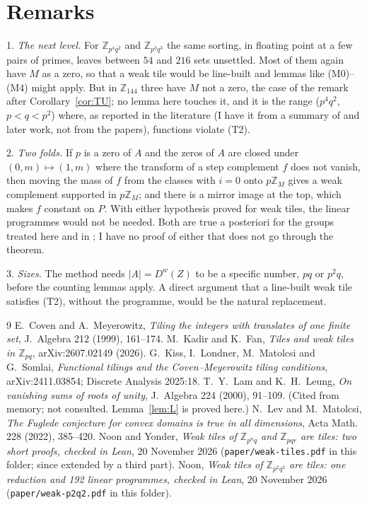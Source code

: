 \documentclass[11pt,a4paper]{amsart}
\theoremstyle{definition}
\theoremstyle{remark}
\newcommand{\Z}{\mathbb{Z}}
\newcommand{\file}[1]{\texttt{#1}}
\newcommand{\Dw}{D^{w}}
\begin{document}
\section{Remarks}\label{sec:rem}

1. \emph{The next level.} For $\Z_{p^4q^2}$ and $\Z_{p^3q^3}$ the same sorting, in floating point at a few pairs of
primes, leaves between $54$ and $216$ sets unsettled. Most of them again have $M$ as a zero, so that a weak tile
would be line-built and lemmas like (M0)--(M4) might apply. But in $\Z_{144}$ three have $M$ not a zero, the case
of the remark after Corollary~\ref{cor:TU}; no lemma here touches it, and it is the range ($p^4q^2$, $p<q<p^2$)
where, as reported in the literature (I have it from a summary of \cite{KLMS} and later work, not from
the papers), functions violate (T2).

2. \emph{Two folds.} If $p$ is a zero of $A$ and the zeros of $A$ are closed under $(0,m)\mapsto(1,m)$ where the
transform of a step complement $f$ does not vanish, then moving the mass of $f$ from the classes with $i=0$ onto
$p\Z_M$ gives a weak complement supported in $p\Z_M$; and there is a mirror image at the top, which makes $f$
constant on $P$. With either hypothesis proved for weak tiles, the linear programmes would not be needed. Both
are true a posteriori for the groups treated here and in \cite{NY,N2}; I have no proof of either that does not
go through the theorem.

3. \emph{Sizes.} The method needs $|A|=\Dw(Z)$ to be a specific number, $pq$ or $p^2q$, before the counting
lemmas apply. A direct argument that a line-built weak tile satisfies (T2), without the programme, would be the
natural replacement.

\begin{thebibliography}{9}
 E.~Coven and A.~Meyerowitz, \emph{Tiling the integers with translates of one finite set},
J.~Algebra 212 (1999), 161--174.
 M.~Kadir and K.~Fan, \emph{Tiles and weak tiles in $\Z_{pq}$}, arXiv:2607.02149 (2026).
 G.~Kiss, I.~Londner, M.~Matolcsi and G.~Somlai, \emph{Functional tilings and the
Coven--Meyerowitz tiling conditions}, arXiv:2411.03854; Discrete Analysis 2025:18.
 T.~Y.~Lam and K.~H.~Leung, \emph{On vanishing sums of roots of unity}, J.~Algebra 224 (2000),
91--109. (Cited from memory; not consulted. Lemma~\ref{lem:L} is proved here.)
 N.~Lev and M.~Matolcsi, \emph{The Fuglede conjecture for convex domains is true in all
dimensions}, Acta Math. 228 (2022), 385--420.
 Noon and Yonder, \emph{Weak tiles of $\Z_{p^nq}$ and $\Z_{pqr}$ are tiles: two short proofs, checked
in Lean}, 20 November 2026 (\file{paper/weak-tiles.pdf} in this folder; since extended by a third part).
 Noon, \emph{Weak tiles of $\Z_{p^2q^2}$ are tiles: one reduction and 192 linear programmes, checked
in Lean}, 20 November 2026 (\file{paper/weak-p2q2.pdf} in this folder).
\end{thebibliography}
\end{document}
